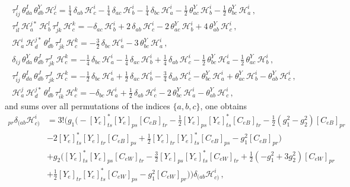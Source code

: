 \begin{gather}
    \tau^I_{ij}\,\theta^I_{da}\,\theta^Y_{db}\,\mathcal{H}^j_c
= \frac{1}{4}\,\delta_{ab}\,\mathcal{H}^i_c
- \frac{1}{4}\,\delta_{ac}\,\mathcal{H}^i_b
- \frac{1}{4}\,\delta_{bc}\,\mathcal{H}^i_a
- \frac{1}{2}\,\theta^Y_{ac}\,\mathcal{H}^i_b
- \frac{1}{2}\,\theta^Y_{bc}\,\mathcal{H}^i_a\,,\\
\tau^I_{il}\,\mathcal{H}^{j*}_a\,\mathcal{H}^l_b\,\tau^I_{jk}\,\mathcal{H}^k_c
= -\delta_{ac}\,\mathcal{H}^i_b
+ 2\,\delta_{ab}\,\mathcal{H}^i_c
- 2\,\theta^Y_{ac}\,\mathcal{H}^i_b
+ 4\,\theta^Y_{ab}\,\mathcal{H}^i_c\,,
\\
\mathcal{H}^i_a\,\mathcal{H}^{j*}_d\,\theta^I_{db}\,\tau^I_{jk}\,\mathcal{H}^k_c
= -\frac{3}{2}\,\delta_{bc}\,\mathcal{H}^i_a
- 3\,\theta^Y_{bc}\,\mathcal{H}^i_a\,,
\\
\delta_{ij}\,\theta^Y_{da}\,\theta^J_{db}\,\tau^J_{jk}\,\mathcal{H}^k_c
= -\frac{1}{4}\,\delta_{bc}\,\mathcal{H}^i_a
- \frac{1}{4}\,\delta_{ac}\,\mathcal{H}^i_b
+ \frac{1}{4}\,\delta_{ab}\,\mathcal{H}^i_c
- \frac{1}{2}\,\theta^Y_{bc}\,\mathcal{H}^i_a
- \frac{1}{2}\,\theta^Y_{ac}\,\mathcal{H}^i_b\,,
\\
\tau^I_{ij}\,\theta^I_{da}\,\theta^J_{db}\,\tau^J_{jk}\,\mathcal{H}^k_c
= -\frac{1}{2}\,\delta_{bc}\,\mathcal{H}^i_a
+ \frac{1}{2}\,\delta_{ac}\,\mathcal{H}^i_b
- \frac{3}{4}\,\delta_{ab}\,\mathcal{H}^i_c
- \theta^Y_{bc}\,\mathcal{H}^i_a
+ \theta^Y_{ac}\,\mathcal{H}^i_b
- \theta^Y_{ab}\,\mathcal{H}^i_c\,,
\\
\mathcal{H}^j_a\,\mathcal{H}^{j*}_d\,\theta^I_{db}\,\tau^I_{ik}\,\mathcal{H}^k_c
= -\delta_{bc}\,\mathcal{H}^i_a
+ \frac{1}{2}\,\delta_{ab}\,\mathcal{H}^i_c
- 2\,\theta^Y_{bc}\,\mathcal{H}^i_a
- \theta^Y_{ab}\,\mathcal{H}^i_c\,,
\end{gather}
and sums over all permutations of the indices $\{a,b,c\}$, one obtains
\begin{align}
[\dot C_{eH}]_{pr}\delta_{(ab}\mathcal H_{c)}^i &= 3!\bigg(g_1\bigg(
-[Y_e]^*_{ts}[Y_e]_{ps}[C_{eB}]_{tr} %
-\frac{1}{2} [Y_e]_{ps}[Y_e]^*_{ts}[C_{eB}]_{tr} %
- \frac{1}{2}\left(g_1^2  - g_2^2 \right)[C_{eB}]_{pr} \nonumber \\&
- 2 [Y_e]^*_{ts}[Y_e]_{tr}[C_{eB}]_{ps} %
+\frac{1}{2} [Y_e]_{tr}[Y_e]^*_{ts}[C_{eB}]_{ps} %
- g_1^2 [C_{eB}]_{pr}\bigg) \nonumber \\&
+ g_2\bigg([Y_e]^*_{ts}[Y_e]_{ps}[C_{eW}]_{tr} %
-\frac{3}{2} [Y_e]_{ps}[Y_e]^*_{ts}[C_{eW}]_{tr} %
+ \frac{1}{2}\left(-g_1^2  +3 g_2^2\right)[C_{eW}]_{pr} \nonumber \\&
+\frac{1}{2} [Y_e]_{tr}[Y_e]^*_{ts}[C_{eW}]_{ps} %
-  g_1^2[C_{eW}]_{pr}
\bigg)\bigg)\delta_{(ab}\mathcal H_{c)}^i
\,,
\end{align}
